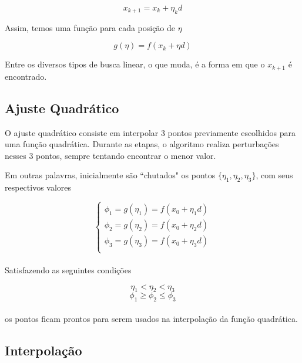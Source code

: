 \documentclass[12pt]{article}
\begin{document}
\begin{equation} \label{eq:posicao_x}
x_{k + 1} = x_{k} + \eta_{k}d
\end{equation}

Assim, temos uma função para cada posição de $\eta$

\begin{equation} \label{eq:equacao_phi}
g(\eta) = f(x_{k} + \eta d)
\end{equation}

Entre os diversos tipos de busca linear, o que muda, é a forma em que o $x_{k + 1}$ é encontrado.

\subsection{Ajuste Quadrático}
\mbox{}

O ajuste quadrático consiste em interpolar 3 pontos previamente escolhidos para uma função quadrática. Durante as etapas, o algoritmo realiza perturbações nesses 3 pontos, sempre tentando encontrar o menor valor.

Em outras palavras, inicialmente são ``chutados" os pontos $\{\eta_1, \eta_2, \eta_3\}$, com seus respectivos valores

\[ \left\{ 
\begin{array}{l} 
	\phi_1 = g(\eta_1) = f(x_0 + \eta_1 d) \\
	\phi_2 = g(\eta_2) = f(x_0 + \eta_2 d) \\
	\phi_3 = g(\eta_3) = f(x_0 + \eta_3 d) \\
\end{array} \right.\] \\

Satisfazendo as seguintes condições

\begin{equation} \label{eq:condicao_eta}
	\eta_1 < \eta_2 < \eta_3 
\end{equation} 
\begin{equation} \label{eq:condicao_phi}
	\phi_1 \geq \phi_2 \leq \phi_3
\end{equation} \\

os pontos ficam prontos para serem usados na interpolação da função quadrática.

\subsection{Interpolação}
\mbox{}
\end{document}
